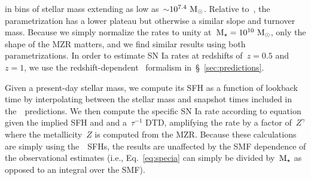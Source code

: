 \documentclass[foo.tex]{subfiles}
\begin{document}
in bins of stellar mass extending as low as~$\sim$$10^{7.4}~\msun$.
Relative to~\citet{Zahid2014}, the~\citet{Andrews2013} parametrization has a
lower plateau but otherwise a similar slope and turnover mass.
Because we simply normalize the rates to unity at~$\mstar = 10^{10}~\msun$,
only the shape of the MZR matters, and we find similar results using both
parametrizations.
In order to estimate SN Ia rates at redshifts of~$z = 0.5$ and~$z = 1$,
we use the redshift-dependent~\citet{Zahid2014} formalism
in~\S~\ref{sec:predictions}.
\par
Given a present-day stellar mass, we compute its SFH as a function of
lookback time by interpolating between the stellar mass and snapshot times
included in the~\um~predictions.
We then compute the specific SN Ia rate according to equation~
given the implied SFH and and a~$\tau^{-1}$ DTD, amplifying the rate by a
factor of~$Z^\gamma$ where the metallicity~$Z$ is computed from the
\citet{Zahid2014} MZR.
Because these calculations are simply using the~\um~SFHs, the results are
unaffected by the SMF dependence of the observational estimates (i.e.,
Eq.~\ref{eq:specia} can simply be divided by~$\mstar$ as opposed to an integral
over the SMF).
$$
\end{document}
